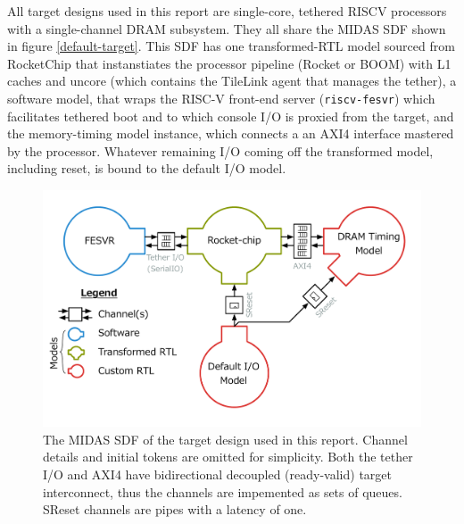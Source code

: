 All target designs used in this report are single-core, tethered RISCV
processors with a single-channel DRAM subsystem.  They all share the MIDAS SDF
shown in figure \ref{default-target}. This SDF has one transformed-RTL model
sourced from RocketChip that instanstiates the processor pipeline (Rocket or
BOOM) with L1 caches and uncore (which contains the TileLink agent that manages
the tether), a software model, that wraps the RISC-V front-end server
(\texttt{riscv-fesvr}) which facilitates tethered boot and to which console I/O
is proxied from the target, and the memory-timing model instance, which
connects a an AXI4 interface mastered by the processor. Whatever remaining I/O
coming off the transformed model, including reset, is bound to the default I/O
model.

\begin{figure}
	\centering
	\includegraphics[width=\textwidth]{figures/masters-target.pdf}
    \caption{The MIDAS SDF of the target design used in this report. Channel
    details and initial tokens are omitted for simplicity. Both the tether I/O
    and AXI4 have bidirectional decoupled (ready-valid) target interconnect,
    thus the channels are impemented as sets of queues. SReset channels are pipes with
    a latency of one.}
	\label{fig:default-target}
\end{figure}


